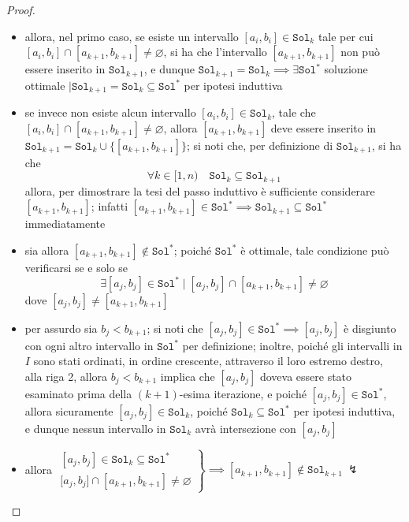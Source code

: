 \documentclass[14pt]{extreport}
\theoremstyle{definition}
\theoremstyle{definition}
\begin{document}
\begin{proof}
\begin{itemize}
\begin{itemize}
                \item allora, nel primo caso, se esiste un intervallo $[a_i, b_i] \in \texttt{Sol}_k$ tale per cui $[a_i, b_i] \cap [a_{k + 1}, b_{k + 1}] \neq \varnothing$, si ha che l'intervallo $[a_{k + 1}, b_{k + 1}]$ non può essere inserito in $\texttt{Sol}_{k + 1}$, e dunque $\texttt{Sol}_{k + 1} = \texttt{Sol}_k \implies \exists \texttt{Sol}^*$ soluzione ottimale $\mid \texttt{Sol}_{k + 1} = \texttt{Sol}_k \subseteq \texttt{Sol}^*$ per ipotesi induttiva
                \item se invece non esiste alcun intervallo $[a_i, b_i] \in \texttt{Sol}_k$, tale che $[a_i, b_i] \cap [a_{k + 1}, b_{k + 1}] \neq \varnothing$, allora $[a_{k + 1}, b_{k + 1}]$ deve essere inserito in $\texttt{Sol}_{k + 1} = \texttt{Sol}_k \cup \{[a_{k + 1}, b_{k + 1}]\}$; si noti che, per definizione di $\texttt{Sol}_{k + 1}$, si ha che $$\forall k \in [1, n) \quad \texttt{Sol}_k \subseteq \texttt{Sol}_{k + 1}$$ allora, per dimostrare la tesi del passo induttivo è sufficiente considerare $[a_{k + 1}, b_{k + 1}]$; infatti $[a_{k + 1}, b_{k + 1}] \in \texttt{Sol}^* \implies \texttt{Sol}_{k +1} \subseteq \texttt{Sol}^*$ immediatamente
                \item sia allora $[a_{k +1}, b_{k +1}] \notin \texttt{Sol}^*$; poiché $\texttt{Sol}^*$ è ottimale, tale condizione può verificarsi se e solo se $$\exists [a_j, b_j] \in \texttt{Sol}^* \mid [a_j, b_j] \cap [a_{k +1}, b_{k +1}] \neq \varnothing$$
                dove $[a_j, b_j] \neq [a_{k +1},b_{k +1}]$
                \item per assurdo sia $b_j < b_{k + 1}$; si noti che $[a_j, b_j] \in \texttt{Sol}^* \implies [a_j, b_j]$ è disgiunto con ogni altro intervallo in $\texttt{Sol}^*$ per definizione; inoltre, poiché gli intervalli in $I$ sono stati ordinati, in ordine crescente, attraverso il loro estremo destro, alla riga 2, allora $b_j < b_{k + 1}$ implica che $[a_j, b_j]$ doveva essere stato esaminato prima della $(k + 1)$-esima iterazione, e poiché $[a_j, b_j] \in \texttt{Sol}^*$, allora sicuramente $[a_j, b_j] \in \texttt{Sol}_k$, poiché $\texttt{Sol}_k \subseteq \texttt{Sol}^*$ per ipotesi induttiva, e dunque nessun intervallo in $\texttt{Sol}_k$ avrà intersezione con $[a_j, b_j]$
                \item allora $\left. \begin{array}{l} [a_j, b_j] \in \texttt{Sol}_k \subseteq \texttt{Sol}^* \\ {[}a_j, b_j] \cap [a_{k +1}, b_{k + 1}] \neq \varnothing \end{array}\right \} \implies [a_{k +1}, b_{k +1}] \notin \texttt{Sol}_{k +1} \ \lightning$ 

\end{itemize}
\end{itemize}
\end{proof}
\end{document}
